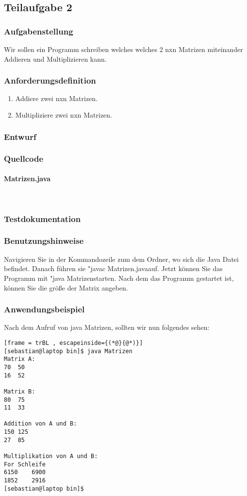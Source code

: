 \subsection{Teilaufgabe 2}
\subsubsection{Aufgabenstellung}
Wir sollen ein Programm schreiben welches welches 2 nxn Matrizen miteinander Addieren und Multiplizieren kann.

\subsubsection{Anforderungsdefinition}
\begin{enumerate}
	\item Addiere zwei nxn Matrizen.
	\item Multipliziere zwei nxn Matrizen.
\end{enumerate}

\subsubsection{Entwurf}


\subsubsection{Quellcode}
\paragraph{Matrizen.java}\


\subsubsection{Testdokumentation}

\subsubsection{Benutzungshinweise}
Navigieren Sie in der Kommandozeile zum dem Ordner, wo sich die Java Datei befindet.
Danach führen sie "javac Matrizen.java\dq \space auf. Jetzt können Sie das Programm mit
"java Matrizen\dq \space starten. Nach dem das Programm gestartet ist, können Sie die
grö\ss e der Matrix angeben.

\subsubsection{Anwendungsbeispiel}
Nach dem Aufruf von java Matrizen, sollten wir nun folgendes sehen:
\begin{lstlisting}[frame = trBL , escapeinside={(*@}{@*)}]
[sebastian@laptop bin]$ java Matrizen
Matrix A:
70	50	
16	52	

Matrix B:
80	75	
11	33	

Addition von A und B:
150	125	
27	85	

Multiplikation von A und B:
For Schleife
6150	6900	
1852	2916
[sebastian@laptop bin]$  
\end{lstlisting}
